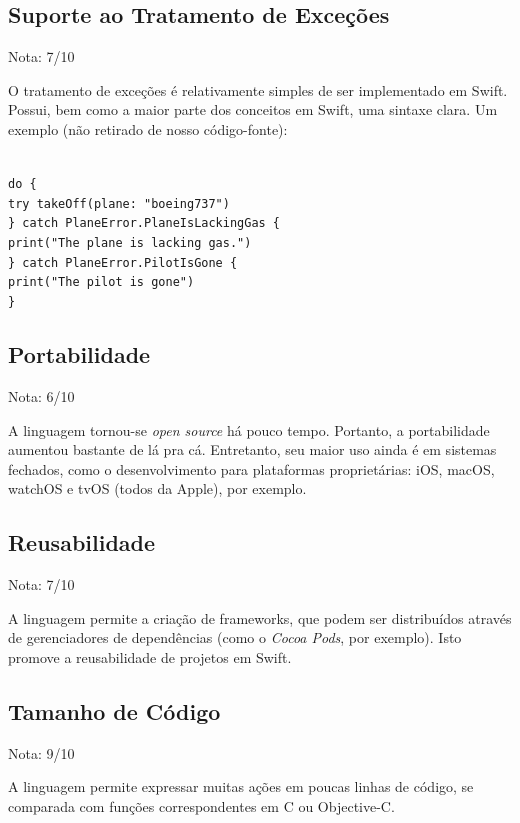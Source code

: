 \documentclass[rel_mlp]{iiufrgs}
\newcommand\tab[1][1cm]{\hspace*{#1}}
\begin{document}
\subsection{Suporte ao Tratamento de Exceções}

Nota: 7/10

O tratamento de exceções é relativamente simples de ser implementado em Swift. Possui, bem como a maior parte dos conceitos em Swift, uma sintaxe clara. Um exemplo (não retirado de nosso código-fonte):

\texttt{
\\do \{
\\\tab try takeOff(plane: "boeing737")
\\\} catch PlaneError.PlaneIsLackingGas \{
\\\tab print("The plane is lacking gas.")
\\\} catch PlaneError.PilotIsGone \{
\\\tab print("The pilot is gone")
\\\}
}

\subsection{Portabilidade}

Nota: 6/10

A linguagem tornou-se \textit{open source} há pouco tempo. Portanto, a portabilidade aumentou bastante de lá pra cá. Entretanto, seu maior uso ainda é em sistemas fechados, como o desenvolvimento para plataformas proprietárias: iOS, macOS, watchOS e tvOS (todos da Apple), por exemplo.

\subsection{Reusabilidade}

Nota: 7/10

A linguagem permite a criação de frameworks, que podem ser distribuídos através de gerenciadores de dependências (como o \textit{Cocoa Pods}, por exemplo). Isto promove a reusabilidade de projetos em Swift.

\subsection{Tamanho de Código}

Nota: 9/10

A linguagem permite expressar muitas ações em poucas linhas de código, se comparada com funções correspondentes em C ou Objective-C.
\end{document}

